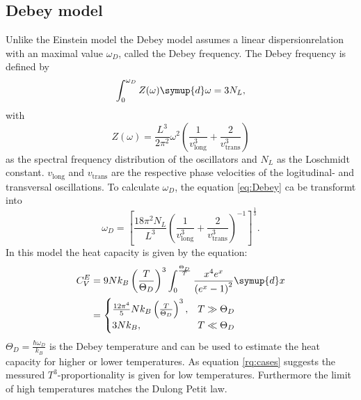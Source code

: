 \subsection{Debey model}
Unlike the Einstein model the Debey model assumes a linear dispersionrelation with an maximal value $\omega_D$, called the Debey frequency.
The Debey frequency is defined by
\begin{equation}
    \label{eq:Debey}
    \int_0^{\omega_D}Z(\omega) \symup{d}\omega = 3 N_L,
\end{equation}
with 
\begin{equation}
    Z(\omega) = \frac{L^3}{2\pi^2}\omega^2\left(\frac{1}{v_\text{long}^3}+\frac{2}{v_\text{trans}^3}\right)
\end{equation} 
as the spectral frequency distribution of the oscillators and $N_L$ as the Loschmidt constant.
$v_\text{long}$ and $v_\text{trans}$ are the respective phase velocities of the logitudinal- and transversal oscillations.
To calculate $\omega_D$, the equation \eqref{eq:Debey} ca be transformt into
\begin{equation}
    \omega_D = \left[\frac{18\pi^2N_L}{L^3}\left(\frac{1}{v_\text{long}^3}+\frac{2}{v_\text{trans}^3}\right)^{-1}\right]^\frac{1}{3}.
\end{equation}
In this model the heat capacity is given by the equation:
\begin{align}
    C_V^E &= 9Nk_B\left(\frac{T}{\Theta_D}\right)^3 \int_0^{\frac{\Theta_D}{T}}\frac{x^4e^x}{\left(e^x-1\right)^2} \symup{d}x \\
    & =
    \begin{cases}
        \label{eq:cases}
    \frac{12\pi^4}{5}Nk_B\left(\frac{T}{\Theta_D}\right)^3 , & T \gg \Theta_D \\
    3Nk_B , & T \ll \Theta_D
    \end{cases}
\end{align}
$\Theta_D=\frac{\hbar \omega_D}{k_B}$ is the Debey temperature and can be used to estimate the heat capacity for higher or lower temperatures.
As equation \eqref{rq:cases} suggests the messured $T^3$-proportionality is given for low temperatures. 
Furthermore the limit of high temperatures matches the Dulong Petit law.







